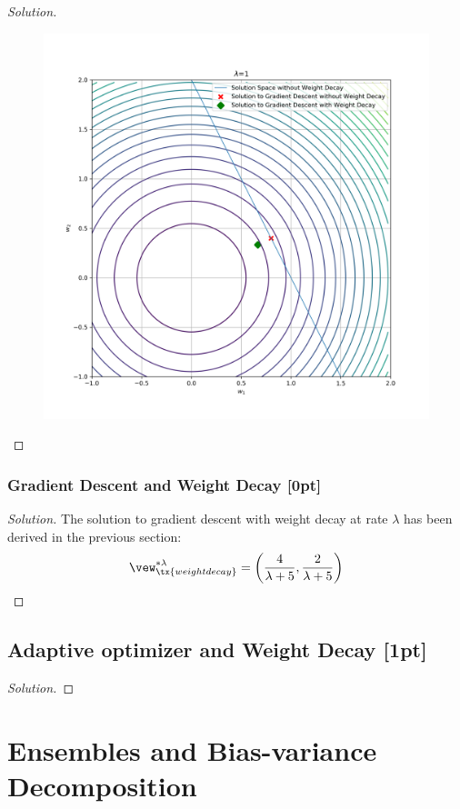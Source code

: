\documentclass{article}
\begin{document}
\begin{proof}[Solution]
\begin{figure}[H]
			\includegraphics[width=\linewidth]{plot_q1.png}
		\end{figure}
	\end{proof}
	
	\subsubsection{Gradient Descent and Weight Decay [0pt]}
	\begin{proof}[Solution]
		The solution to gradient descent with weight decay at rate $\lambda$ has been derived in the previous section:
		\begin{align}
			\vew^{*\lambda}_\tx{weight decay} = \left(\frac{4}{\lambda +5}, \frac{2}{\lambda +5}\right)
		\end{align}
	\end{proof}
	
	\subsection{Adaptive optimizer and Weight Decay [1pt]}
	\begin{proof}[Solution]
		
	\end{proof}
	
	\section{Ensembles and Bias-variance Decomposition}
\end{document}
